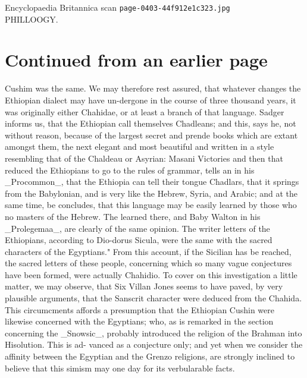 \documentclass{article}
\begin{document}
\begin{center}
{\Large Encyclopaedia Britannica scan \texttt{page-0403-44f912e1c323.jpg}}\\[0.5em]
PHILLOOGY.
\end{center}
\section*{Continued from an earlier page}
Cushim was the same. We may therefore rest assured, that whatever changes the Ethiopian dialect may have un-dergone in the course of three thousand years, it was originally either Chahidae, or at least a branch of that language. Sadger informs us, that the Ethiopian call themselves Chadleans; and this, says he, not without reason, because of the largest secret and prende books which are extant amongst them, the next elegant and most beautiful and written in a style resembling that of the Chaldeau or Asyrian: Masani Victories and then that reduced the Ethiopians to go to the rules of grammar, tells an in his \_Procommon\_, that the Ethiopia can tell their tongue Chadlars, that it springs from the Babylonian, and is very like the Hebrew, Syria, and Arabic; and at the same time, be concludes, that this language may be easily learned by those who no masters of the Hebrew. The learned there, and Baby Walton in his \_Prolegemaa\_, are clearly of the same opinion. The writer letters of the Ethiopians, according to Dio-dorus Sicula, were the same with the sacred characters of the Egyptians." From this account, if the Sicilian has be reached, the sacred letters of these people, concerning which so many vague conjectures have been formed, were actually Chahidio. To cover on this investigation a little matter, we may observe, that Six Villan Jones seems to have paved, by very plausible arguments, that the Sanscrit character were deduced from the Chahida. This circumcments affords a presumption that the Ethiopian Cushin were likewise concerned with the Egyptians; who, as is remarked in the section concerning the \_Snowsic\_, probably introduced the religion of the Brahman into Hisolution. This is ad- vanced as a conjecture only; and yet when we consider the affinity between the Egyptian and the Grenzo religions, are strongly inclined to believe that this simism may one day for its verbularable facts.
\end{document}
